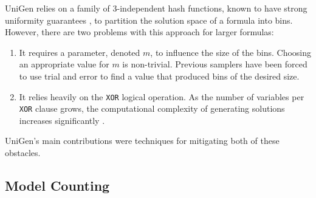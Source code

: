 UniGen relies on a family of 3-independent hash functions, known to have strong uniformity guarantees \cite{gomes_near-uniform_2007}, to partition the solution space of a formula into bins. However, there are two problems with this approach for larger formulas:

\begin{enumerate}
\item It requires a parameter, denoted $m$, to influence the size of the bins. Choosing an appropriate value for $m$ is non-trivial. Previous samplers have been forced to use trial and error to find a value that produced bins of the desired size.
\item It relies heavily on the \texttt{XOR} logical operation. As the number of variables per \texttt{XOR} clause grows, the computational complexity of generating solutions increases significantly \cite{Gomes:2007:SXM:1768142.1768155}.
  \end{enumerate}

UniGen's main contributions were techniques for mitigating both of these obstacles.



\subsection{Model Counting}

